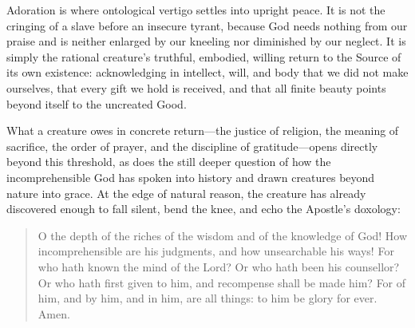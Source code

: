 Adoration is where ontological vertigo settles into upright peace. It is not the cringing of a slave before an insecure tyrant, because God needs nothing from our praise and is neither enlarged by our kneeling nor diminished by our neglect. It is simply the rational creature's truthful, embodied, willing return to the Source of its own existence: acknowledging in intellect, will, and body that we did not make ourselves, that every gift we hold is received, and that all finite beauty points beyond itself to the uncreated Good.

What a creature owes in concrete return---the justice of religion, the meaning of sacrifice, the order of prayer, and the discipline of gratitude---opens directly beyond this threshold, as does the still deeper question of how the incomprehensible God has spoken into history and drawn creatures beyond nature into grace. At the edge of natural reason, the creature has already discovered enough to fall silent, bend the knee, and echo the Apostle's doxology:

\begin{quote}
O the depth of the riches of the wisdom and of the knowledge of God! How incomprehensible are his judgments, and how unsearchable his ways! For who hath known the mind of the Lord? Or who hath been his counsellor? Or who hath first given to him, and recompense shall be made him? For of him, and by him, and in him, are all things: to him be glory for ever. Amen.
\end{quote}
